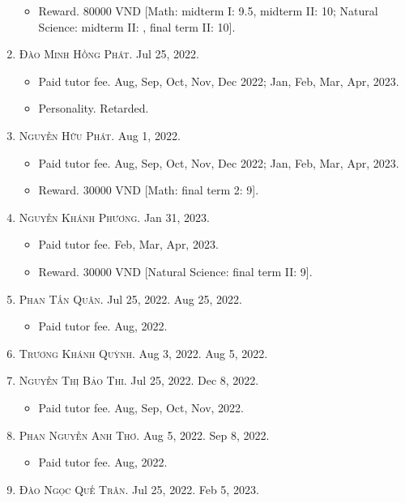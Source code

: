 \documentclass{article}
\begin{document}
\begin{enumerate}
\begin{itemize}
		\item {\sf Reward.} 80000 VND [Math: midterm I: 9.5, midterm II: 10; Natural Science: midterm II: , final term II: 10].
	\end{itemize}
	\item \textsc{Đào Minh Hồng Phát.} {\sf[In]} Jul 25, 2022.
	\begin{itemize}
		\item {\sf Paid tutor fee.} Aug, Sep, Oct, Nov, Dec 2022; Jan, Feb, Mar, Apr, 2023.
		\item {\sf Personality.} Retarded.
	\end{itemize}
	\item \textsc{Nguyễn Hữu Phát.} {\sf[In]} Aug 1, 2022.
	\begin{itemize}
		\item {\sf Paid tutor fee.} Aug, Sep, Oct, Nov, Dec 2022; Jan, Feb, Mar, Apr, 2023.
		\item {\sf Reward.} 30000 VND [Math: final term 2: 9].
	\end{itemize}
	\item \textsc{Nguyễn Khánh Phương.}  {\sf[In]} Jan 31, 2023.
	\begin{itemize}
		\item {\sf Paid tutor fee.} Feb, Mar, Apr, 2023.
		\item {\sf Reward.} 30000 VND [Natural Science: final term II: 9].
	\end{itemize}
	\item \textsc{Phan Tấn Quân.} {\sf[In]} Jul 25, 2022. {\sf[Out]} Aug 25, 2022.
	\begin{itemize}
		\item {\sf Paid tutor fee.} Aug, 2022.
	\end{itemize}
	\item \textsc{Trương Khánh Quỳnh.} {\sf[In]} Aug 3, 2022. {\sf[Out]} Aug 5, 2022.
	\item \textsc{Nguyễn Thị Bảo Thi.} {\sf[In]} Jul 25, 2022. {\sf[Out]} Dec 8, 2022.
	\begin{itemize}
		\item {\sf Paid tutor fee.} Aug, Sep, Oct, Nov, 2022.
	\end{itemize}
	\item \textsc{Phan Nguyễn Anh Thơ.} {\sf[In]} Aug 5, 2022. {\sf[Out]} Sep 8, 2022.
	\begin{itemize}
		\item {\sf Paid tutor fee.} Aug, 2022.
	\end{itemize}
	\item \textsc{Đào Ngọc Quế Trân.} {\sf[In]} Jul 25, 2022. {\sf[Out]} Feb 5, 2023.

\end{enumerate}
\end{document}
